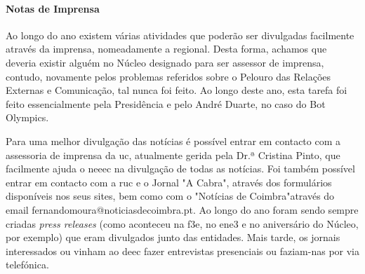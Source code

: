 
\paragraph{Notas de Imprensa}

Ao longo do ano existem várias atividades que poderão ser divulgadas facilmente através da imprensa, nomeadamente a regional. Desta forma, achamos que deveria existir alguém no Núcleo designado para ser assessor de imprensa, contudo, novamente pelos problemas referidos sobre o Pelouro das Relações Externas e Comunicação, tal nunca foi feito. Ao longo deste ano, esta tarefa foi feito essencialmente pela Presidência e pelo André Duarte, no caso do Bot Olympics.

Para uma melhor divulgação das notícias é possível entrar em contacto com a assessoria de imprensa da \acrshort{uc}, atualmente gerida pela Dr.ª Cristina Pinto, que facilmente ajuda o \acrshort{neeec} na divulgação de todas as notícias. Foi também possível entrar em contacto com a \acrfull{ruc} e o Jornal "A Cabra", através dos formulários disponíveis nos seus sites, bem como com o "Notícias de Coimbra"\space através do email fernandomoura@noticiasdecoimbra.pt. Ao longo do ano foram sendo sempre criadas \textit{press releases} (como aconteceu na \acrshort{f3e}, no \acrshort{ene3} e no aniversário do Núcleo, por exemplo) que eram divulgados junto das entidades. Mais tarde, os jornais interessados ou vinham ao \acrshort{deec} fazer entrevistas presenciais ou faziam-nas por via telefónica.